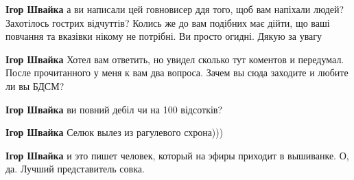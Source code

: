 \begin{itemize}
\begin{itemize}
 
\textbf{Ігор Швайка} а ви написали цей говновисер ддя того, щоб вам напіхали
людей? Захотілось гострих відчуттів? Колись же до вам подібних має дійти, що
ваші повчання та вказівки нікому не потрібні. Ви просто огидні. Дякую за увагу

 
\textbf{Ігор Швайка} Хотел вам ответить, но увидел сколько тут коментов и передумал. После прочитанного у меня к вам два вопроса. Зачем вы сюда заходите и любите ли вы БДСМ?

 
\textbf{Ігор Швайка} ви повний дебіл чи на 100 відсотків?

 
\textbf{Ігор Швайка}
Селюк вылез из рагулевого схрона)))

 
\textbf{Ігор Швайка} и это пишет человек, который на эфиры приходит в вышиванке. О, да. Лучший представитель совка.

 

\end{itemize}
\end{itemize}
